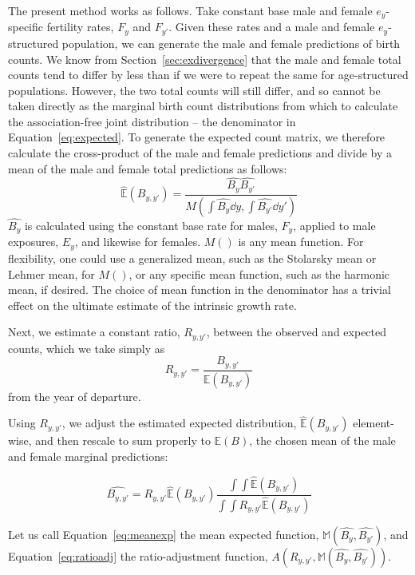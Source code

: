 
The present method works as follows. Take constant base male and female
$e_y$-specific fertility rates, $F_y$ and $F_{y'}$. Given these rates and a male
and female $e_y$-structured population, we can generate the male and female predictions of
birth counts. We know from Section~\ref{sec:exdivergence} that the male and
female total counts tend to differ by less than if we were to repeat the
same for age-structured populations. However, the two total counts will still
differ, and so cannot be taken directly as the marginal birth count distributions from
which to calculate the association-free joint distribution -- the denominator
in Equation~\eqref{eq:expected}. To generate the expected count matrix, we
therefore calculate the cross-product of the male and female predictions and
divide by a mean of the male and female total predictions as follows:
\begin{equation}
\label{eq:meanexp}
\widehat{\mathbb{E}}(B_{y,y'}) = \frac{\widehat{B_y} \widehat{B_{y'}}}{M(\int
\widehat{B_y} \dd y, \int \widehat{B_{y'}} \dd y')}
\end{equation}
$\widehat{B_y}$ is calculated using the constant base rate for males,
$F_y$, applied to male exposures, $E_y$, and likewise for females. $M()$ is any
mean function. For flexibility, one could use a generalized mean, such as the
Stolarsky mean or Lehmer mean, for $M()$, or any specific mean function, such as
the harmonic mean, if desired. The choice of mean function in the denominator
has a trivial effect on the ultimate estimate of the intrinsic growth rate.

Next, we estimate a constant ratio, $R_{y,y'}$, between the
observed and expected counts, which we take simply as
\begin{equation}
\label{eq:getR}
R_{y,y'} = \frac{B_{y,y'}}{\mathbb{E}(B_{y,y'})}
\end{equation}
from the year of departure.

Using $R_{y,y'}$, we adjust the estimated expected distribution,
$\widehat{\mathbb{E}}(B_{y,y'})$ element-wise, and then rescale to sum properly
to $\mathbb{E}(B)$, the chosen mean of the male and female marginal
predictions:

\begin{equation}
\label{eq:ratioadj}
\widehat{B_{y,y'}} = R_{y,y'}\widehat{\mathbb{E}}(B_{y,y'})\frac{\int \int
\widehat{\mathbb{E}}(B_{y,y'})}{\int \int
R_{y,y'}\widehat{\mathbb{E}}(B_{y,y'})}
\end{equation}

Let us call Equation~\eqref{eq:meanexp} the mean
expected function, $\mathbb{M}(\widehat{B_y}, \widehat{B_{y'}})$, and
Equation~\eqref{eq:ratioadj} the ratio-adjustment function, 
$A(R_{y,y'},\mathbb{M}(\widehat{B_y}, \widehat{B_{y'}}))$.

